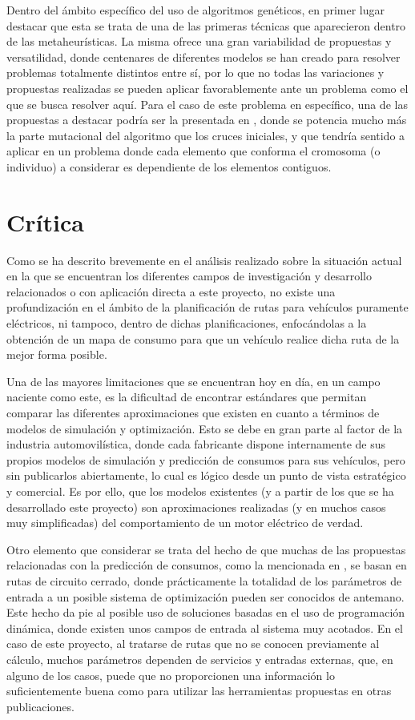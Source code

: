 \documentclass[11pt,spanish,listoffigures,listoftables]{tfgetsinf}
\begin{document}
Dentro del ámbito específico del uso de algoritmos genéticos, en primer lugar destacar que esta se trata de una de las primeras técnicas que aparecieron dentro de las metaheurísticas. La misma ofrece una gran variabilidad de propuestas y versatilidad, donde centenares de diferentes modelos se han creado para resolver problemas totalmente distintos entre sí, por lo que no todas las variaciones y propuestas realizadas se pueden aplicar favorablemente ante un problema como el que se busca resolver aquí. Para el caso de este problema en específico, una de las propuestas a destacar podría ser la presentada en \cite{DEFALCO2002285}, donde se potencia mucho más la parte mutacional del algoritmo que los cruces iniciales, y que tendría sentido a aplicar en un problema donde cada elemento que conforma el cromosoma (o individuo) a considerar es dependiente de los elementos contiguos.

\section{Crítica}
Como se ha descrito brevemente en el análisis realizado sobre la situación actual en la que se encuentran los diferentes campos de investigación y desarrollo relacionados o con aplicación directa a este proyecto, no existe una profundización en el ámbito de la planificación de rutas para vehículos puramente eléctricos, ni tampoco, dentro de dichas planificaciones, enfocándolas a la obtención de un mapa de consumo para que un vehículo realice dicha ruta de la mejor forma posible.

Una de las mayores limitaciones que se encuentran hoy en día, en un campo naciente como este, es la dificultad de encontrar estándares que permitan comparar las diferentes aproximaciones que existen en cuanto a términos de modelos de simulación y optimización. Esto se debe en gran parte al factor de la industria automovilística, donde cada fabricante dispone internamente de sus propios modelos de simulación y predicción de consumos para sus vehículos, pero sin publicarlos abiertamente, lo cual es lógico desde un punto de vista estratégico y comercial. Es por ello, que los modelos existentes (y a partir de los que se ha desarrollado este proyecto) son aproximaciones realizadas (y en muchos casos muy simplificadas) del comportamiento de un motor eléctrico de verdad.

Otro elemento que considerar se trata del hecho de que muchas de las propuestas relacionadas con la predicción de consumos, como la mencionada en \cite{Bader13}, se basan en rutas de circuito cerrado, donde prácticamente la totalidad de los parámetros de entrada a un posible sistema de optimización pueden ser conocidos de antemano. Este hecho da pie al posible uso de soluciones basadas en el uso de programación dinámica, donde existen unos campos de entrada al sistema muy acotados. En el caso de este proyecto, al tratarse de rutas que no se conocen previamente al cálculo, muchos parámetros dependen de servicios y entradas externas, que, en alguno de los casos, puede que no proporcionen una información lo suficientemente buena como para utilizar las herramientas propuestas en otras publicaciones.
\end{document}
